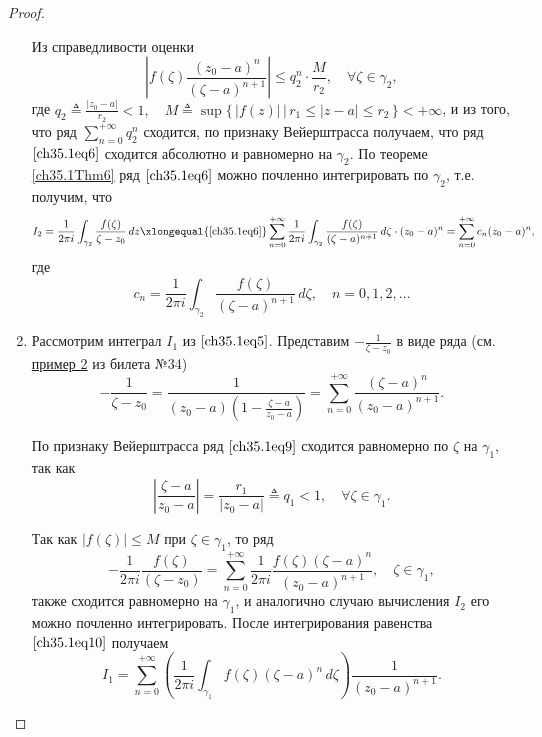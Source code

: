 \begin{proof}
\begin{enumerate}[wide, labelwidth=!, labelindent=\parindent]
Из справедливости оценки
$$
\left| f(\zeta) \frac{(z_0 - a)^n}{(\zeta - a)^{n + 1}}\right| \le q_{2}^n \cdot \frac{M}{r_2}, \quad \forall \zeta \in \gamma_2,
$$
где $q_2 \triangleq \frac{|z_0 - a|}{r_2} < 1, \quad M \triangleq \sup \{\, |f(z)| \,\big|\, r_1 \le |z - a| \le r_2\,\} < +\infty$, и из того, что ряд $\sum\limits_{n = 0}^{+\infty} q_{2}^n$ сходится, по признаку Вейерштрасса получаем, что ряд $\eqref{ch35.1eq6}$ сходится абсолютно и равномерно на $\gamma_2$. По теореме \ref{ch35.1Thm6}  ряд $\eqref{ch35.1eq6}$ можно почленно интегрировать по $\gamma_2$, т.е. получим, что 
\begin{equation} \label{ch35.1eq7}
I_2 = \frac{1}{2\pi i} \int_{\gamma_2} \frac{f(\zeta)}{\zeta - z_0} \,d z \xlongequal{\eqref{ch35.1eq6}} \sum\limits_{n = 0}^{+\infty} \frac{1}{2\pi i} \int_{\gamma_2} \frac{f(\zeta)}{(\zeta - a)^{n + 1}} \,d\zeta \cdot (z_0 - a)^n = \sum\limits_{n = 0}^{+\infty} c_n (z_0 - a)^n,
\end{equation}
где 
\begin{equation} \label{ch35.1eq8}
c_n = \frac{1}{2\pi i} \int_{\gamma_2}  \frac{f(\zeta)}{(\zeta - a)^{n + 1}} \,d\zeta, \quad n = 0,1,2,\ldots
\end{equation}

\item
Рассмотрим интеграл $I_1$ из $\eqref{ch35.1eq5}$. Представим $-\frac{1}{\zeta - z_0}$ в виде ряда (см. \hyperref[exmpl2]{пример 2} из билета №34)
\begin{equation} \label{ch35.1eq9}
-\frac{1}{\zeta - z_0} = \frac{1}{(z_0 - a) \left( 1 - \frac{\zeta - a}{z_0 - a}\right)} = \sum_{n = 0}^{+\infty} \frac{(\zeta - a)^n}{(z_0 - a)^{n + 1}}.
\end{equation}

По признаку Вейерштрасса ряд $\eqref{ch35.1eq9}$ сходится равномерно по $\zeta$ на $\gamma_1$, так как
$$
\left| \frac{\zeta - a}{z_0 - a}\right| = \frac{r_1}{|z_0 - a|} \triangleq q_1 < 1, \quad \forall \zeta \in \gamma_1.
$$

Так как $|f(\zeta)| \le M$ при $\zeta \in \gamma_1$, то ряд
\begin{equation} \label{ch35.1eq10}
-\frac{1}{2\pi i} \frac{f(\zeta)}{(\zeta - z_0)} = \sum\limits_{n = 0}^{+\infty} \frac{1}{2\pi i} \frac{f(\zeta)(\zeta - a)^n}{(z_0 - a)^{n + 1}}, \quad \zeta \in \gamma_1,
\end{equation}
также сходится равномерно на $\gamma_1$, и аналогично случаю вычисления $I_2$ его можно почленно интегрировать. После интегрирования равенства $\eqref{ch35.1eq10}$ получаем
\begin{equation} \label{ch35.1eq11}
I_1 = \sum\limits_{n = 0}^{+\infty} \left( \frac{1}{2\pi i} \int_{\gamma_1} f(\zeta)(\zeta - a)^n \,d\zeta\right) \frac{1}{(z_0 - a)^{n + 1}}.
\end{equation}


\end{enumerate}
\end{proof}
